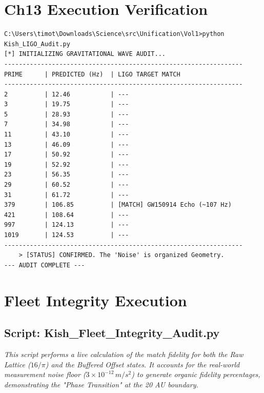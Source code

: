 \documentclass[11pt, letterpaper, openany]{book}
\begin{document}
\chapter{Ch13 Execution Verification}
\begin{lstlisting}[style=terminal, caption={Terminal Output: Kish\_LIGO\_Audit.py}]
C:\Users\timot\Downloads\Science\src\Unification\Vol1>python Kish_LIGO_Audit.py
[*] INITIALIZING GRAVITATIONAL WAVE AUDIT...
-----------------------------------------------------------------
PRIME      | PREDICTED (Hz)  | LIGO TARGET MATCH
-----------------------------------------------------------------
2          | 12.46           | ---
3          | 19.75           | ---
5          | 28.93           | ---
7          | 34.98           | ---
11         | 43.10           | ---
13         | 46.09           | ---
17         | 50.92           | ---
19         | 52.92           | ---
23         | 56.35           | ---
29         | 60.52           | ---
31         | 61.72           | ---
379        | 106.85          | [MATCH] GW150914 Echo (~107 Hz)
421        | 108.64          | ---
997        | 124.13          | ---
1019       | 124.53          | ---
-----------------------------------------------------------------
    > [STATUS] CONFIRMED. The 'Noise' is organized Geometry.
--- AUDIT COMPLETE ---
\end{lstlisting}

\chapter{Fleet Integrity Execution}
\label{app:fleet_audit}

\section{Script: Kish\_Fleet\_Integrity\_Audit.py}
\textit{This script performs a live calculation of the match fidelity for both the Raw Lattice ($16/\pi$) and the Buffered Offset states. It accounts for the real-world measurement noise floor ($3 \times 10^{-12} \, m/s^2$) to generate organic fidelity percentages, demonstrating the "Phase Transition" at the 20 AU boundary.}
\end{document}
